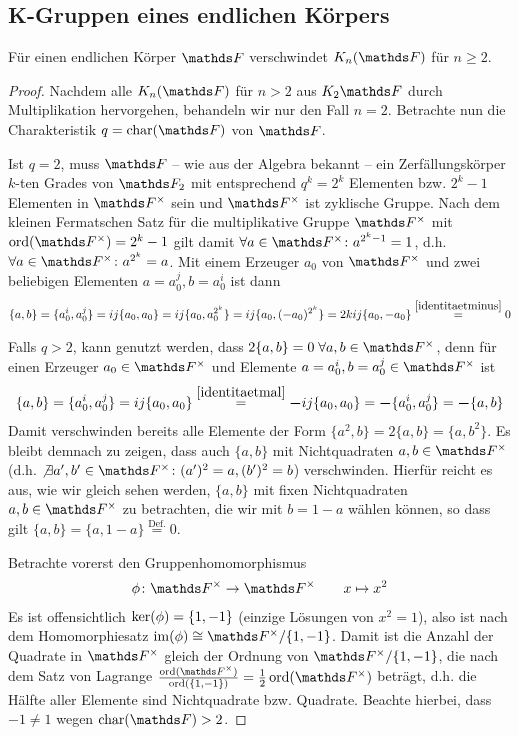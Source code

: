 \documentclass[ngerman,fontsize=11pt, paper=a4, parskip=half, titlepage=true, toc=bib]{scrartcl}
\begin{document}
\subsection{K-Gruppen eines endlichen Körpers}

\begin{Lem}
  Für einen endlichen Körper $\F$ verschwindet $\KnF$ für $n\geq 2$.
  \begin{proof}
    Nachdem alle $\KnF$ für $n>2$ aus $\K_2\F$ durch Multiplikation
    hervorgehen, behandeln wir nur den Fall $n=2$.
    Betrachte nun die Charakteristik $q=\Char(\F)$ von $\F$.

    Ist $q=2$, muss $\F$ – wie aus der Algebra bekannt – ein
    Zerfällungskörper $k$-ten Grades von $\F_2$ mit entsprechend
    $q^k=2^k$ Elementen bzw. $2^k-1$ Elementen in $\Fx$ sein und $\Fx$
    ist zyklische Gruppe.
    Nach dem kleinen Fermatschen Satz für die multiplikative Gruppe
    $\Fx$ mit $\Ord(\Fx)=2^k-1$ gilt damit $\forall a\in\Fx\colon a^{2^k-1}=1$, 
    d.h. $\forall a\in\Fx\colon a^{2^k} = a$.
    Mit einem Erzeuger $a_0$ von $\Fx$ und zwei beliebigen Elementen $a=a_0^j,
    b=a_0^i$ ist dann
    \begin{gather*}
      \{a,b\}=\{a_0^i, a_0^j\} = ij\{a_0,a_0\}
      = ij\{a_0,a_0^{2^k}\} = ij\{a_0, (-a_0)^{2^k}\} =
      2kij\{a_0,-a_0\} 
      \overset{\ref{identitaetminus}}{=} 0
    \end{gather*}

    Falls $q>2$, kann genutzt werden, dass $2\{a,b\}=0\;\forall a,b\in\Fx$,
    denn für einen Erzeuger $a_0\in\Fx$ und
    Elemente $a=a_0^i,b=a_0^j\in \Fx$ ist
    \begin{gather*}
      \{a,b\} = \{a_0^i,a_0^j\} = ij\{a_0,a_0\} 
      \overset{\ref{identitaetmal}}{=} \boldsymbol - ij\{a_0,a_0\}
      = \boldsymbol - \{a_0^i,a_0^j\} = \boldsymbol -\{a,b\} 
    \end{gather*}
    Damit verschwinden bereits alle Elemente der Form 
    $\{a^2,b\}=2\{a,b\}=\{a,b^2\}$. Es bleibt demnach zu zeigen, dass
    auch $\{a,b\}$ mit Nichtquadraten $a,b\in\Fx$
    (d.h. $\not\exists a',b'\in\Fx\colon (a')^2=a,(b')^2=b$)
    verschwinden.
    Hierfür reicht es aus, wie wir gleich sehen werden,
    $\{a,b\}$ mit fixen Nichtquadraten
    $a,b\in\Fx$ zu betrachten, die wir mit $b=1-a$ wählen können, 
    so dass gilt $\{a,b\}=\{a,1-a\}\overset{\text{Def.}}{=}0$.
    
    Betrachte vorerst den Gruppenhomomorphismus
    \begin{gather*}
      \phi\colon\Fx \to \Fx
      \qquad x\mapsto x^2
    \end{gather*}
    Es ist offensichtlich $\operatorname{ker}(\phi)=\{1,-1\}$ (einzige Lösungen von
    $x^2=1$), also ist nach dem Homomorphiesatz
    $\im(\phi)\cong \Fx/\{1,-1\}$. Damit ist die Anzahl der Quadrate
    in $\Fx$ gleich der Ordnung von $\Fx/\{1,-1\}$, die nach dem Satz
    von Lagrange
    $\frac{\Ord(\Fx)}{\Ord(\{1,-1\})}=\frac{1}{2}\Ord(\Fx)$
    beträgt, d.h. die Hälfte aller Elemente sind Nichtquadrate
    bzw. Quadrate. Beachte hierbei, dass $-1\neq 1$ wegen $\Char(\F)>2$.


\end{proof}
\end{Lem}
\end{document}
